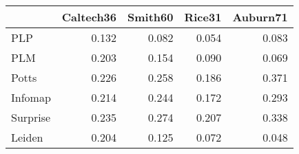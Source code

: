 \begin{tabular}{lrrrr}
\toprule
{} & Caltech36 & Smith60 & Rice31 & Auburn71 \\
\midrule
PLP      &     0.132 &   0.082 &  0.054 &    0.083 \\
PLM      &     0.203 &   0.154 &  0.090 &    0.069 \\
Potts    &     0.226 &   0.258 &  0.186 &    0.371 \\
Infomap  &     0.214 &   0.244 &  0.172 &    0.293 \\
Surprise &     0.235 &   0.274 &  0.207 &    0.338 \\
Leiden   &     0.204 &   0.125 &  0.072 &    0.048 \\
\bottomrule
\end{tabular}
